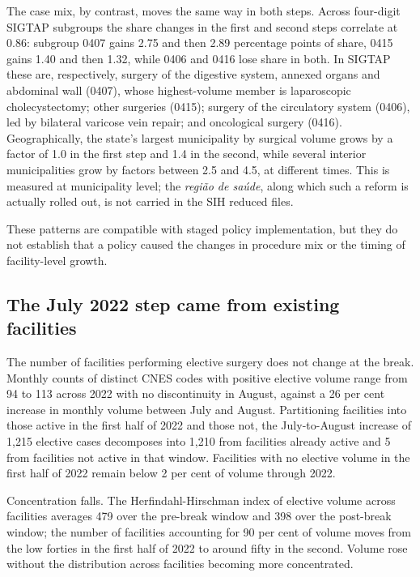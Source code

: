 The case mix, by contrast, moves the same way in both steps. Across four-digit
SIGTAP subgroups the share changes in the first and second steps correlate at
0.86: subgroup 0407 gains 2.75 and then 2.89 percentage points of share, 0415
gains 1.40 and then 1.32, while 0406 and 0416 lose share in both. In SIGTAP these are, respectively, surgery of the digestive system, annexed organs and abdominal wall (0407), whose highest-volume member is laparoscopic cholecystectomy; other surgeries (0415); surgery of the circulatory system (0406), led by bilateral varicose vein repair; and oncological surgery (0416). Geographically, the state's
largest municipality by surgical volume grows by a factor of 1.0 in the first
step and 1.4 in the second, while several interior municipalities grow by
factors between 2.5 and 4.5, at different times. This is measured at
municipality level; the \emph{regi\~ao de sa\'ude}, along which such a reform is
actually rolled out, is not carried in the SIH reduced files.

These patterns are compatible with staged policy implementation, but they do not establish that a policy caused the changes in procedure mix or the timing of facility-level growth.


\subsection{The July 2022 step came from existing facilities}
\label{sec:appb2}

The number of facilities performing elective surgery does not change at the
break. Monthly counts of distinct CNES codes with positive elective volume
range from 94 to 113 across 2022 with no discontinuity in August, against a 26
per cent increase in monthly volume between July and August. Partitioning
facilities into those active in the first half of 2022 and those not, the
July-to-August increase of 1{,}215 elective cases decomposes into 1{,}210 from
facilities already active and 5 from facilities not active in that window.
Facilities with no elective volume in the first half of 2022 remain below
2 per cent of volume through 2022.

Concentration falls. The Herfindahl-Hirschman index of elective volume across
facilities averages 479 over the pre-break window and 398 over the post-break
window; the number of facilities accounting for 90 per cent of volume moves
from the low forties in the first half of 2022 to around fifty in the second.
Volume rose without the distribution across facilities becoming more
concentrated.

